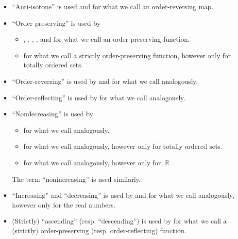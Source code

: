 \begin{remark}
\begin{itemize}
    \item \enquote{Anti-isotone} is used  and  for what we call an order-reversing map.

    \item \enquote{Order-preserving} is used by
    \begin{itemize}
       \item {}, , , ,  and  for what we call an order-preserving function.

       \item {} for what we call a strictly order-preserving function, however only for totally ordered sets.
    \end{itemize}

    \item \enquote{Order-reversing} is used by  and  for what we call analogously.

    \item \enquote{Order-reflecting} is used by  for what we call analogously.

    \item \enquote{Nondecreasing} is used by
    \begin{itemize}
      \item {} for what we call analogously.
      \item {} for what we call analogously, however only for totally ordered sets.
      \item {} for what we call analogously, however only for \( \BbbR \).
    \end{itemize}

    The term \enquote{nonincreasing} is used similarly.

    \item \enquote{Increasing} and \enquote{decreasing} is used by  and  for what we call analogously, however only for the real numbers.

    \item (Strictly) \enquote{ascending} (resp. \enquote{descending}) is used by  for what we call a (strictly) order-preserving (resp. order-reflecting) function.


\end{itemize}
\end{remark}
